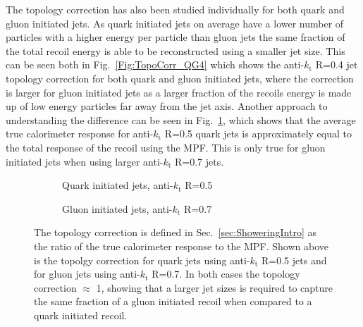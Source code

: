 The topology correction has also been studied individually for both quark and gluon initiated jets.
As quark initiated jets on average have a lower number of particles with a higher energy per particle than gluon jets the same fraction of the total recoil energy is able to be reconstructed using a smaller jet size.  
This can be seen both in Fig.~\ref{Fig:TopoCorr_QG4} which shows the anti-$k_\mathrm{t}$ R=0.4 jet topology correction for both quark and gluon initiated jets, where the correction is larger for gluon initiated jets as a larger fraction of the recoils energy is made up of low energy particles far away from the jet axis.  
Another approach to understanding the difference can be seen in Fig.~\ref{Fig:TopoCorr_QGSizes}, which shows that the average true calorimeter response for anti-$k_\mathrm{t}$ R=0.5 quark jets is approximately equal to the total response of the recoil using the MPF.  
This is only true for gluon initiated jets when using larger anti-$k_\mathrm{t}$ R=0.7 jets.  

\begin{figure}[!ht]
  \centering
  \begin{subfigure}{.5\textwidth}
    \centering
    \caption{Quark initiated jets, anti-$k_\mathrm{t}$ R=0.5}
  \end{subfigure}%
  \begin{subfigure}{.5\textwidth}  \centering
    \caption{Gluon initiated jets, anti-$k_\mathrm{t}$ R=0.7}
  \end{subfigure}
  \caption[Topology correction for quark/gluon initiated jets.]
{\small The topology correction is defined in Sec.~\ref{sec:ShoweringIntro} as the ratio of the true calorimeter response to the MPF.  Shown above is the topolgy correction for quark jets using anti-$k_\mathrm{t}$ R=0.5 jets and for gluon jets using anti-$k_\mathrm{t}$ R=0.7.  In both cases the topology correction $\approx$ 1, showing that a larger jet sizes is required to capture the same fraction of a gluon initiated recoil when compared to a quark initiated recoil.  }
  \label{Fig:TopoCorr_QGSizes}
\end{figure}

